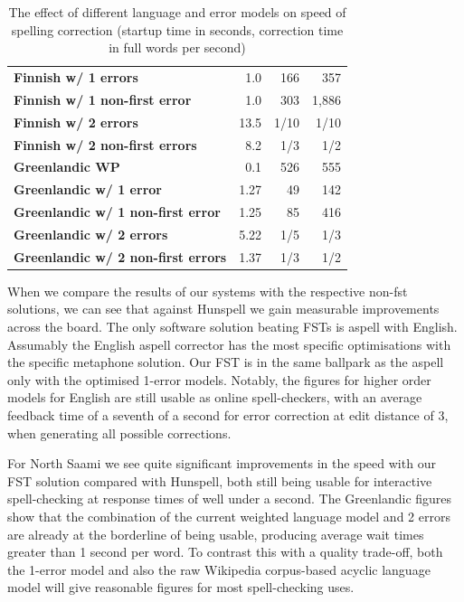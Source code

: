 \documentclass[a4paper,12pt]{article}
\begin{document}
\begin{table}
\begin{tabular}{|l|r|r|r|}
        \bf Finnish w/ 1 errors   & 1.0  & 166 & 357   \\
\bf Finnish w/ 1 non-first error  & 1.0  & 303 & 1,886  \\
        \bf Finnish w/ 2 errors   & 13.5 & 1/10 & 1/10 \\
\bf Finnish w/ 2 non-first errors & 8.2  & 1/3  & 1/2 \\
        \hline
        \bf Greenlandic WP    & 0.1  & 526 & 555\\
        \hline
        \bf Greenlandic w/ 1 error    & 1.27 & 49 & 142 \\
\bf Greenlandic w/ 1 non-first error  & 1.25 & 85 & 416 \\
       \bf Greenlandic w/ 2 errors    & 5.22 & 1/5 & 1/3 \\
\bf Greenlandic w/ 2 non-first errors & 1.37 & 1/3 & 1/2 \\
        \hline
    \end{tabular}
    \caption{The effect of different language and error models on speed of
        spelling correction (startup time in seconds, correction time in 
        full words per second) \label{table:speed}}
\end{table}

When we compare the results of our systems with the respective non-fst
solutions, we can see that against Hunspell we gain measurable improvements
across the board. The only software solution beating FSTs is aspell with
English. Assumably the English aspell corrector has the most specific
optimisations with the specific metaphone solution. Our FST is in the same
ballpark as the aspell only with the optimised 1-error models.  Notably, the
figures for higher order models for English are still usable as online
spell-checkers, with an average feedback time of a seventh of a second for
error correction at edit distance of 3, when generating all possible
corrections.

For North Saami we see quite significant improvements in the speed with our FST
solution compared with Hunspell, both still being usable for interactive
spell-checking at response times of well under a second. The Greenlandic
figures show that the combination of the current weighted language model and 2
errors are already at the borderline of being usable, producing average wait
times greater than 1 second per word. To contrast this with a quality
trade-off, both the 1-error model and also the raw Wikipedia corpus-based
acyclic language model will give reasonable figures for most spell-checking
uses.
\end{document}
